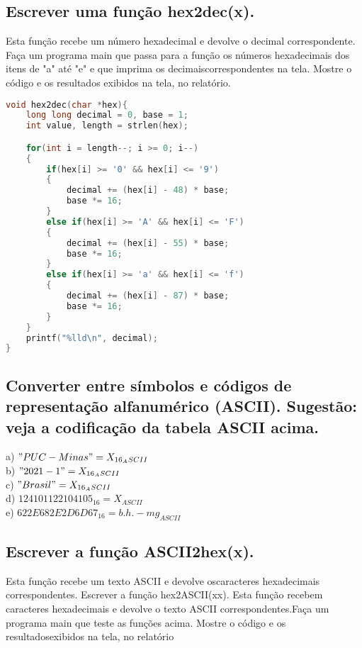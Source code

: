 \documentclass[12pt]{article}
\begin{document}
\subsection{Escrever uma função hex2dec(x).}
Esta função recebe um número hexadecimal e devolve o decimal correspondente. Faça um 
programa main que passa para a função os números hexadecimais dos itens de "a" até "e" 
e que imprima os decimaiscorrespondentes na tela. Mostre o código e os resultados 
exibidos na tela, no relatório.

\begin{lstlisting}[language=C]
void hex2dec(char *hex){
    long long decimal = 0, base = 1;
    int value, length = strlen(hex);

    for(int i = length--; i >= 0; i--)
    {
        if(hex[i] >= '0' && hex[i] <= '9')
        {
            decimal += (hex[i] - 48) * base;
            base *= 16;
        }
        else if(hex[i] >= 'A' && hex[i] <= 'F')
        {
            decimal += (hex[i] - 55) * base;
            base *= 16;
        }
        else if(hex[i] >= 'a' && hex[i] <= 'f')
        {
            decimal += (hex[i] - 87) * base;
            base *= 16;
        }
    }
    printf("%lld\n", decimal);
}

\end{lstlisting}

\subsection{Converter entre símbolos e códigos de representação alfanumérico (ASCII). Sugestão: veja a codificação da tabela ASCII acima.}
a) $"PUC-Minas" = X_{16_ASCII}$\\
b) $"2021-1" = X_{16_ASCII}$\\
c) $"Brasil" = X_{16_ASCII}$\\
d) $124 101 122 104 105_{16} = X_{ASCII}$\\
e) $62 2E 68 2E 2D 6D 67_{16} = b.h.-mg_{ASCII}$\\

\subsection{Escrever a função ASCII2hex(x).}
Esta função recebe um texto ASCII e devolve oscaracteres hexadecimais correspondentes.
Escrever a função hex2ASCII(xx). Esta função recebem caracteres hexadecimais e devolve 
o texto ASCII correspondentes.Faça um programa main que teste as funções acima. Mostre 
o código e os resultadosexibidos na tela, no relatório



\end{document}
